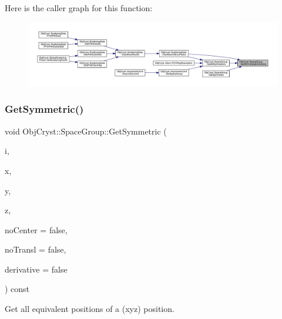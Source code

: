 Here is the caller graph for this function\+:
\nopagebreak
\begin{figure}[H]
\begin{center}
\leavevmode
\includegraphics[width=350pt]{class_obj_cryst_1_1_space_group_ab29b2dbdb97ed82c9b609c7f59a3e656_icgraph}
\end{center}
\end{figure}
\mbox{\label{class_obj_cryst_1_1_space_group_ad3108808abdecebd126cf54d811c9b30}} 
\subsubsection{\texorpdfstring{GetSymmetric()}{GetSymmetric()}}
{\footnotesize\ttfamily void Obj\+Cryst\+::\+Space\+Group\+::\+Get\+Symmetric (\begin{DoxyParamCaption}\item[{unsigned int}]{i,  }\item[{R\+E\+AL \&}]{x,  }\item[{R\+E\+AL \&}]{y,  }\item[{R\+E\+AL \&}]{z,  }\item[{const bool}]{no\+Center = {\ttfamily false},  }\item[{const bool}]{no\+Transl = {\ttfamily false},  }\item[{const bool}]{derivative = {\ttfamily false} }\end{DoxyParamCaption}) const}



Get all equivalent positions of a (xyz) position. 



